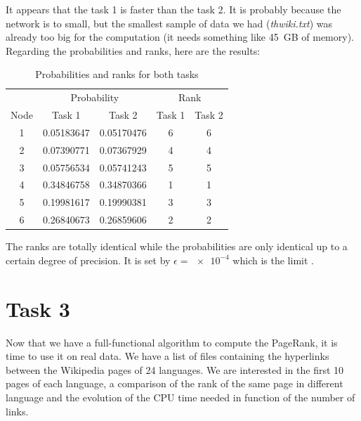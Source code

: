  It appears that the task 1 is faster than the task 2. It is probably because the network is to small, but the smallest sample of data we had (\textit{thwiki.txt}) was already too big for the computation (it needs something like \SI{45}{\giga B} of memory). Regarding the probabilities and ranks, here are the results:

\begin{table}[htbp]
    \centering
    \begin{tabular}{ccccc}
        \toprule
        & \multicolumn{2}{c}{Probability} & \multicolumn{2}{c}{Rank}\\
        \cmidrule(l{2pt}r{2pt}){2-3} \cmidrule(l{2pt}r{2pt}){4-5}
        Node & Task 1 & Task 2 & Task 1 & Task 2\\
        \midrule
        1 & 0.05183647 & 0.05170476 & 6 & 6\\
        2 & 0.07390771 & 0.07367929 & 4 & 4\\
        3 & 0.05756534 & 0.05741243 & 5 & 5\\
        4 & 0.34846758 & 0.34870366 & 1 & 1\\
        5 & 0.19981617 & 0.19990381 & 3 & 3\\
        6 & 0.26840673 & 0.26859606 & 2 & 2\\
        \bottomrule
    \end{tabular}
    \caption{Probabilities and ranks for both tasks}\label{tab:prob-rank-comparison}
\end{table}

The ranks are totally identical while the probabilities are only identical up to a certain degree of precision. It is set by $\epsilon = \num{e-4}$ which is the limit .
\section{Task 3}
Now that we have a full-functional algorithm to compute the PageRank, it is time to use it on real data. We have a list of files containing the hyperlinks between the Wikipedia pages of 24 languages. We are interested in the first 10 pages of each language, a comparison of the rank of the same page in different language and the evolution of the CPU time needed in function of the number of links.

